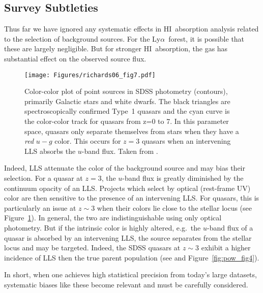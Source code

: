 \documentclass[graybox]{svmult}
\newcommand{\HI}{H{\sc I}}
\def\lya{Ly$\alpha$}
\begin{document}
\subsection{Survey Subtleties}
\label{sec:lls_bias}

Thus far we have ignored any systematic effects in \HI\
absorption analysis related to the selection of background
sources.  For the \lya\ forest, it is possible that these
are largely negligible.    But for stronger \HI\ absorption,
the gas has substantial effect on the observed source
flux.  

%
\begin{figure}[b]
\sidecaption
\texttt{[image: Figures/richards06\_fig7.pdf]}
%
%
\caption{Color-color plot of point sources in SDSS photometry
(contours), primarily Galactic stars and white dwarfs.
The black triangles are spectroscopically confirmed Type~1 quasars
and the cyan curve is the color-color track for quasars
from z=0 to 7.  In this parameter space, quasars only separate
themselves from stars when they have a {\it red} $u-g$ color.
This occurs for $z=3$ quasars when an intervening LLS absorbs
the $u$-band flux.
Taken from \cite{RichardsSED06}.
}
\label{fig:r06_fig7}       %
\end{figure}

Indeed, LLS attenuate the color of the 
background source  and may bias their selection. 
For a quasar at $z=3$, the
$u$-band flux is greatly diminished by the continuum
opacity of an LLS.  Projects which 
select by optical (rest-frame UV) color
are then sensitive to the presence of an
intervening LLS.  For quasars, this is particularly
an issue at $z \sim 3$ when
their colors lie close to the stellar locus
(see Figure~\ref{fig:r06_fig7}).
In general, the two are indistinguishable using only optical
photometry.  But if the intrinsic color is highly altered,
e.g.\ the $u$-band flux of a quasar is absorbed by an intervening LLS,
the source separates from the stellar locus and may be
targeted.  Indeed, the SDSS quasars at $z \sim 3$ exhibit
a higher incidence of LLS then the true parent population
(see \cite{pow10} and Figure~\ref{fig:pow_fig4}).

In short, when one achieves high statistical precision
from today's large datasets, systematic biases like
these become relevant and must be carefully considered.
\end{document}
